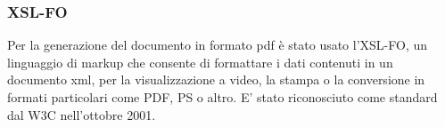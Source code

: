 \subsubsection{XSL-FO}
Per la generazione del documento in formato pdf è stato usato l'XSL-FO, un linguaggio di markup che consente di formattare i dati contenuti in un documento xml, per la visualizzazione a video, la stampa o la conversione in formati particolari come PDF, PS o altro. E' stato riconosciuto come standard dal W3C nell'ottobre 2001.


